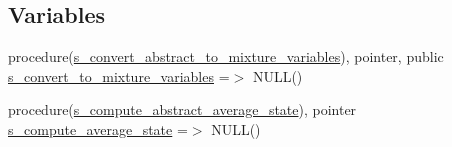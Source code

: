 \subsection*{Variables}
\begin{DoxyCompactItemize}
\item 
procedure(\hyperlink{interfacem__variables__conversion_1_1s__convert__abstract__to__mixture__variables}{s\+\_\+convert\+\_\+abstract\+\_\+to\+\_\+mixture\+\_\+variables}), pointer, public \hyperlink{namespacem__variables__conversion_a2f790d774fdcc87779b89a71ae3f2674}{s\+\_\+convert\+\_\+to\+\_\+mixture\+\_\+variables} =$>$ N\+U\+LL()
\item 
procedure(\hyperlink{interfacem__variables__conversion_1_1s__compute__abstract__average__state}{s\+\_\+compute\+\_\+abstract\+\_\+average\+\_\+state}), pointer \hyperlink{namespacem__variables__conversion_a2071f3e7e4336e3e87f259e72ccdb8b1}{s\+\_\+compute\+\_\+average\+\_\+state} =$>$ N\+U\+LL()
\end{DoxyCompactItemize}
